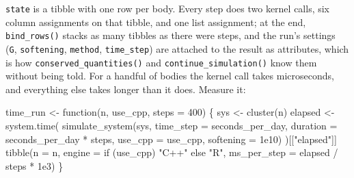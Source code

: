 \documentclass[
  10.5pt,
  letterpaper,
]{scrbook}
\newenvironment{Shaded}{\begin{snugshade}}{\end{snugshade}}
\newcommand{\AttributeTok}[1]{\textcolor[rgb]{0.00,0.00,0.00}{#1}}
\newcommand{\ControlFlowTok}[1]{\textcolor[rgb]{0.00,0.00,0.00}{#1}}
\newcommand{\DecValTok}[1]{\textcolor[rgb]{0.00,0.00,0.00}{#1}}
\newcommand{\FloatTok}[1]{\textcolor[rgb]{0.00,0.00,0.00}{#1}}
\newcommand{\FunctionTok}[1]{\textcolor[rgb]{0.00,0.00,0.00}{#1}}
\newcommand{\NormalTok}[1]{\textcolor[rgb]{0.00,0.00,0.00}{#1}}
\newcommand{\OtherTok}[1]{\textcolor[rgb]{0.00,0.00,0.00}{#1}}
\newcommand{\SpecialCharTok}[1]{\textcolor[rgb]{0.00,0.00,0.00}{#1}}
\newcommand{\StringTok}[1]{\textcolor[rgb]{0.00,0.00,0.00}{#1}}
\theoremstyle{plain}
\theoremstyle{remark}
\begin{document}
\texttt{state} is a tibble with one row per body. Every step does two
kernel calls, six column assignments on that tibble, and one list
assignment; at the end, \texttt{bind\_rows()} stacks as many tibbles as
there were steps, and the run's settings (\texttt{G},
\texttt{softening}, \texttt{method}, \texttt{time\_step}) are attached
to the result as attributes, which is how
\texttt{conserved\_quantities()} and \texttt{continue\_simulation()}
know them without being told. For a handful of bodies the kernel call
takes microseconds, and everything else takes longer than it does.
Measure it:

\begin{Shaded}
\begin{Highlighting}[]
\NormalTok{time\_run }\OtherTok{\textless{}{-}} \ControlFlowTok{function}\NormalTok{(n, use\_cpp, }\AttributeTok{steps =} \DecValTok{400}\NormalTok{) \{}
\NormalTok{  sys }\OtherTok{\textless{}{-}} \FunctionTok{cluster}\NormalTok{(n)}
\NormalTok{  elapsed }\OtherTok{\textless{}{-}} \FunctionTok{system.time}\NormalTok{(}
    \FunctionTok{simulate\_system}\NormalTok{(sys, }\AttributeTok{time\_step =}\NormalTok{ seconds\_per\_day,}
                    \AttributeTok{duration =}\NormalTok{ seconds\_per\_day }\SpecialCharTok{*}\NormalTok{ steps,}
                    \AttributeTok{use\_cpp =}\NormalTok{ use\_cpp, }\AttributeTok{softening =} \FloatTok{1e10}\NormalTok{)}
\NormalTok{  )[[}\StringTok{"elapsed"}\NormalTok{]]}
  \FunctionTok{tibble}\NormalTok{(}\AttributeTok{n =}\NormalTok{ n, }\AttributeTok{engine =} \ControlFlowTok{if}\NormalTok{ (use\_cpp) }\StringTok{"C++"} \ControlFlowTok{else} \StringTok{"R"}\NormalTok{,}
         \AttributeTok{ms\_per\_step =}\NormalTok{ elapsed }\SpecialCharTok{/}\NormalTok{ steps }\SpecialCharTok{*} \FloatTok{1e3}\NormalTok{)}
\NormalTok{\}}


\end{Highlighting}
\end{Shaded}
\end{document}

